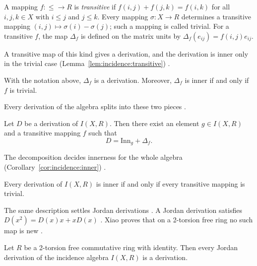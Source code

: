 \begin{definition}\label{def:incidence:transitive}
A mapping $f\colon{\le}\to R$ is \emph{transitive} if
$f(i,j)+f(j,k)=f(i,k)$ for all $i,j,k\in X$ with $i\le j$ and $j\le k$. Every
mapping $\sigma\colon X\to R$ determines a transitive mapping
$(i,j)\mapsto\sigma(i)-\sigma(j)$; such a mapping is called trivial. For a
transitive $f$, the map $\Delta_{f}$ is defined on the matrix units by
$\Delta_{f}(e_{ij})=f(i,j)e_{ij}$.
\end{definition}

A transitive map of this kind gives a derivation, and the derivation is inner
only in the trivial case (Lemma~\ref{lem:incidence:transitive})
\cite[p.~1362]{Xiao2015}.

\begin{lemma}\label{lem:incidence:transitive}
With the notation above, $\Delta_{f}$ is a derivation. Moreover, $\Delta_{f}$ is
inner if and only if $f$ is trivial.
\end{lemma}

Every derivation of the algebra splits into these two pieces
\cite[p.~1362]{Xiao2015}.

\begin{proposition}\label{prop:incidence:split}
Let $D$ be a derivation of $I(X,R)$. Then there exist an element $g\in I(X,R)$ and a
transitive mapping $f$ such that
\begin{equation*}
D=\mathrm{Inn}_{g}+\Delta_{f}.
\end{equation*}
\end{proposition}

The decomposition decides innerness for the whole algebra (Corollary~\ref{cor:incidence:inner})
\cite[p.~1363]{Xiao2015}.\begin{corollary}\label{cor:incidence:inner}
Every derivation of $I(X,R)$ is inner if and only if every transitive mapping is
trivial.
\end{corollary}

The same description settles Jordan derivations \cite[p.~1364]{Xiao2015}. A
Jordan derivation satisfies $D(x^{2})=D(x)x+xD(x)$ \cite[p.~1357]{Xiao2015}.
Xiao proves that on a 2-torsion free ring no such map is new
\cite[p.~1366]{Xiao2015}.

\begin{theorem}\label{thm:incidence:jordan}
Let $R$ be a 2-torsion free commutative ring with identity. Then every Jordan
derivation of the incidence algebra $I(X,R)$ is a derivation.
\end{theorem}

